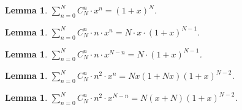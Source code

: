 \documentclass{article}
\newcounter{lemmas}
\newtheorem{lemma}[lemmas]{Lemma}
\begin{document}
\begin{lemma}
\label{Sum1}
$\sum_{n=0}^{N}C_N^{n}\cdot x^{n}=(1+x)^N$.
\end{lemma}
\begin{lemma}
\label{Sum2}
$\sum_{n=0}^{N} C_N^{n}\cdot n\cdot x^{n}=N\cdot x\cdot (1+x)^{N-1}$.
\end{lemma}
\begin{lemma}
\label{Sum3}
$\sum_{n=0}^{N} C_N^{n}\cdot n\cdot x^{N-n}=N\cdot (1+x)^{N-1}$.
\end{lemma}
\begin{lemma}
\label{Sum5}
$\sum_{n=0}^{N} C_N^{n}\cdot n^2\cdot x^{n}=Nx(1+Nx)(1+x)^{N-2}$.
\end{lemma}
\begin{lemma}
\label{Sum6}
$\sum_{n=0}^{N} C_N^{n}\cdot n^2\cdot x^{N-n}=N(x+N)(1+x)^{N-2}$.
\end{lemma}
\end{document}
